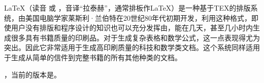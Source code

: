 
LaTeX（读音 或 ，音译“拉泰赫”，通常排板作\LaTeX）是一种基于TEX的排版系统，由美国电脑学家莱斯利·兰伯特在20世纪80年代初期开发，利用这种格式，即使用户没有排版和程序设计的知识也可以充分发挥由，能在几天，甚至几小时内生成很多具有书籍质量的印刷品。对于生成复杂表格和数学公式，这一点表现得尤为突出。因此它非常适用于生成高印刷质量的科技和数学类文档。这个系统同样适用于生成从简单的信件到完整书籍的所有其他种类的文档。

，当前的版本是\LaTeXe。

\newcommand{\guanjianci}{\LaTeX}
